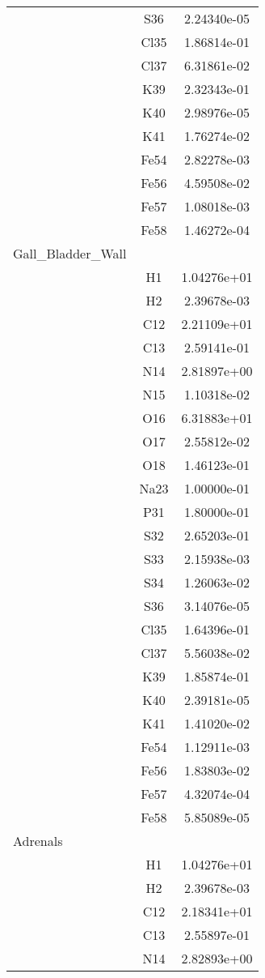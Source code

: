 \begin{centering}
\begin{longtable}{l c c}
& S36 & 2.24340e-05 \\ 
& Cl35 & 1.86814e-01 \\ 
& Cl37 & 6.31861e-02 \\ 
& K39 & 2.32343e-01 \\ 
& K40 & 2.98976e-05 \\ 
& K41 & 1.76274e-02 \\ 
& Fe54 & 2.82278e-03 \\ 
& Fe56 & 4.59508e-02 \\ 
& Fe57 & 1.08018e-03 \\ 
& Fe58 & 1.46272e-04 \\ 
\hline
Gall\_Bladder\_Wall & & \\
\hline
& H1 & 1.04276e+01 \\ 
& H2 & 2.39678e-03 \\ 
& C12 & 2.21109e+01 \\ 
& C13 & 2.59141e-01 \\ 
& N14 & 2.81897e+00 \\ 
& N15 & 1.10318e-02 \\ 
& O16 & 6.31883e+01 \\ 
& O17 & 2.55812e-02 \\ 
& O18 & 1.46123e-01 \\ 
& Na23 & 1.00000e-01 \\ 
& P31 & 1.80000e-01 \\ 
& S32 & 2.65203e-01 \\ 
& S33 & 2.15938e-03 \\ 
& S34 & 1.26063e-02 \\ 
& S36 & 3.14076e-05 \\ 
& Cl35 & 1.64396e-01 \\ 
& Cl37 & 5.56038e-02 \\ 
& K39 & 1.85874e-01 \\ 
& K40 & 2.39181e-05 \\ 
& K41 & 1.41020e-02 \\ 
& Fe54 & 1.12911e-03 \\ 
& Fe56 & 1.83803e-02 \\ 
& Fe57 & 4.32074e-04 \\ 
& Fe58 & 5.85089e-05 \\ 
\hline
Adrenals & & \\
\hline
& H1 & 1.04276e+01 \\ 
& H2 & 2.39678e-03 \\ 
& C12 & 2.18341e+01 \\ 
& C13 & 2.55897e-01 \\ 
& N14 & 2.82893e+00 \\ 

\end{longtable}
\end{centering}
